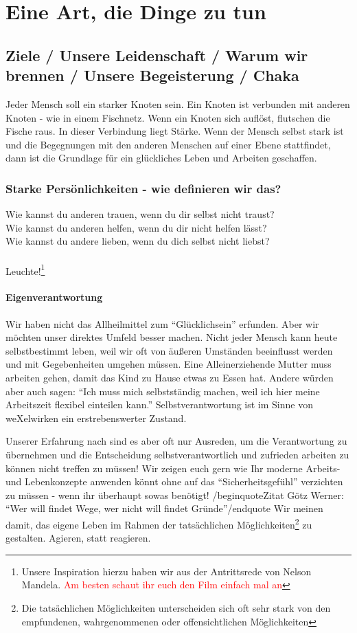 \chapter{Eine Art, die Dinge zu tun}
  \section{Ziele / Unsere Leidenschaft / Warum wir brennen / Unsere Begeisterung / Chaka}
Jeder Mensch soll ein starker Knoten sein. Ein Knoten ist verbunden mit anderen Knoten - wie in einem Fischnetz. Wenn ein Knoten sich auflöst, flutschen die Fische raus.
%
In dieser Verbindung liegt Stärke.
%
Wenn der Mensch selbst stark ist und die Begegnungen mit den anderen Menschen auf einer Ebene stattfindet, dann ist die Grundlage für ein glückliches Leben und Arbeiten geschaffen.
    \subsection{Starke Persönlichkeiten - wie definieren wir das?}
Wie kannst du anderen trauen, wenn du dir selbst nicht traust?\\
Wie kannst du anderen helfen, wenn du dir nicht helfen lässt?\\
Wie kannst du andere lieben, wenn du dich selbst nicht liebst?\\
\\
Leuchte!\footnote{Unsere Inspiration hierzu haben wir aus der Antrittsrede von Nelson Mandela.
\textcolor{red}{Am besten schaut ihr euch den Film einfach mal an}}



      \subsubsection {Eigenverantwortung}
Wir haben nicht das Allheilmittel zum "`Glücklichsein"' erfunden. Aber wir möchten unser direktes Umfeld besser machen.
%
Nicht jeder Mensch kann heute selbstbestimmt leben, weil wir oft von äußeren Umständen beeinflusst werden und mit Gegebenheiten umgehen müssen.
%
Eine Alleinerziehende Mutter muss arbeiten gehen, damit das Kind zu Hause etwas zu Essen hat. 
%
Andere würden aber auch sagen: "`Ich muss mich selbstständig machen, weil ich hier meine Arbeitszeit flexibel einteilen kann."'
%
Selbstverantwortung ist im Sinne von weXelwirken ein erstrebenswerter Zustand.



Unserer Erfahrung nach sind es aber oft nur Ausreden, um die Verantwortung zu übernehmen und die Entscheidung selbstverantwortlich und zufrieden arbeiten zu können nicht treffen zu müssen!
%
Wir zeigen euch gern wie Ihr moderne Arbeits- und Lebenkonzepte anwenden könnt ohne auf das "`Sicherheitsgefühl"' verzichten zu müssen - wenn ihr überhaupt sowas benötigt!
%
/begin{quote}Zitat Götz Werner: "`Wer will findet Wege, wer nicht will findet Gründe"'/end{quote}
%
Wir meinen damit, das eigene Leben im Rahmen der tatsächlichen Möglichkeiten\footnote{Die tatsächlichen Möglichkeiten unterscheiden sich oft sehr stark von den empfundenen, wahrgenommenen oder offensichtlichen Möglichkeiten} zu gestalten.
%
Agieren, statt reagieren.



